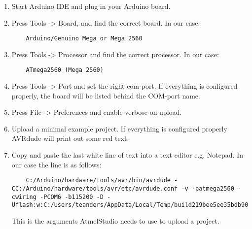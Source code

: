 \begin{enumerate}
    \item Start Arduino IDE and plug in your Arduino board.
    \item Press Tools -> Board, and find the correct board. In our case:
    \begin{lstlisting}
    Arduino/Genuino Mega or Mega 2560
    \end{lstlisting}
    \item Press Tools -> Processor and find the correct processor. In our case:
    \begin{lstlisting}
    ATmega2560 (Mega 2560)
    \end{lstlisting}
    \item Press Tools -> Port and set the right \acrshort{com}-port. If everything is configured properly, the board will be listed behind the COM-port name.
    \item Press File -> Preferences and enable verbose on upload.
    \item Upload a minimal example project. If everything is configured properly AVRdude will print out some red text.
    \item Copy and paste the last white line of text into a text editor e.g. Notepad. In our case the line is as follows:
    \begin{lstlisting}
    C:/Arduino/hardware/tools/avr/bin/avrdude -CC:/Arduino/hardware/tools/avr/etc/avrdude.conf -v -patmega2560 -cwiring -PCOM6 -b115200 -D -Uflash:w:C:/Users/teanders/AppData/Local/Temp/build219bee5ee35bdb906c90832b67c0fe23.tmp/teste.ino.hex:i
    \end{lstlisting}
    This is the arguments AtmelStudio needs to use to upload a project.
\end{enumerate}

